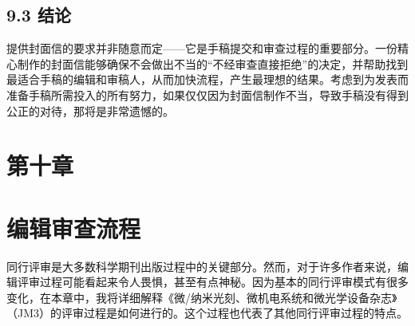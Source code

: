 \subsection*{9.3 结论}
提供封面信的要求并非随意而定——它是手稿提交和审查过程的重要部分。一份精心制作的封面信能够确保不会做出不当的“不经审查直接拒绝”的决定，并帮助找到最适合手稿的编辑和审稿人，从而加快流程，产生最理想的结果。考虑到为发表而准备手稿所需投入的所有努力，如果仅仅因为封面信制作不当，导致手稿没有得到公正的对待，那将是非常遗憾的。

\section*{第十章}
\section*{编辑审查流程}
同行评审是大多数科学期刊出版过程中的关键部分。然而，对于许多作者来说，编辑评审过程可能看起来令人畏惧，甚至有点神秘。因为基本的同行评审模式有很多变化，在本章中，我将详细解释《微/纳米光刻、微机电系统和微光学设备杂志》（JM3）的评审过程是如何进行的。这个过程也代表了其他同行评审过程的特点。

